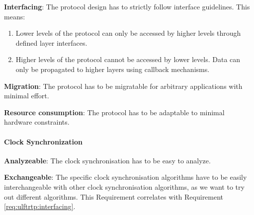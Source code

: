\begin{req}
\label{req:ulftrtp:interfacing}
\textbf{Interfacing}: The protocol design has to strictly follow interface guidelines. This means:
\begin{enumerate}
 \item Lower levels of the protocol can only be accessed by higher levels through defined layer interfaces.
 \item Higher levels of the protocol cannot be accessed by lower levels. Data can only be propagated to higher layers using callback mechanisms. 
\end{enumerate}
\end{req}

\begin{req}
\label{req:ulftrtp:easy migration}
\textbf{Migration}: The protocol has to be migratable for arbitrary applications with minimal effort.
\end{req}

\begin{req}
\label{req:ulftrtp:resource consumption}
\textbf{Resource consumption}: The protocol has to be adaptable to minimal hardware constraints.
\end{req}


\paragraph{Clock Synchronization}
\begin{req}
\label{req:clock:analyzeable}
\textbf{Analyzeable}: The clock synchronisation has to be easy to analyze.
\end{req}

\begin{req}
\label{req:clock:exchangeable}
\textbf{Exchangeable}: The specific clock synchronisation algorithms have to be easily interchangeable with other 
clock synchronisation algorithms, as we want to try out different algorithms. This Requirement correlates with 
Requirement \ref{req:ulftrtp:interfacing}.
\end{req}
